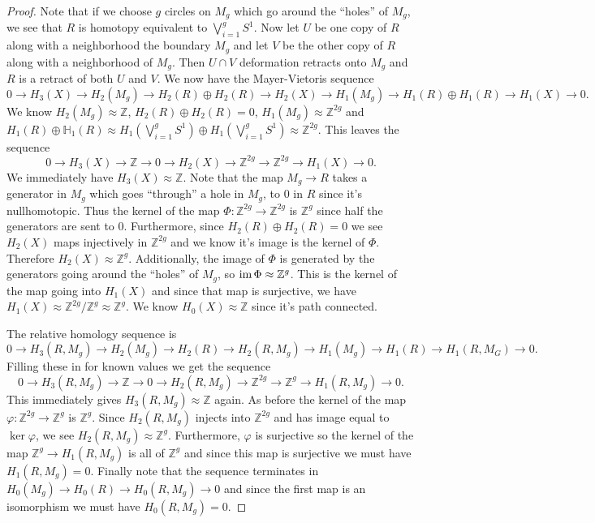 \documentclass{article}
\newcommand{\im}{\textup{im}\,}
\begin{document}
\begin{proof}
Note that if we choose $g$ circles on $M_g$ which go around the ``holes'' of $M_g$, we see that $R$ is homotopy equivalent to $\bigvee_{i=1}^g S^1$. Now let $U$ be one copy of $R$ along with a neighborhood the boundary $M_g$ and let $V$ be the other copy of $R$ along with a neighborhood of $M_g$. Then $U \cap V$ deformation retracts onto $M_g$ and $R$ is a retract of both $U$ and $V$. We now have the Mayer-Vietoris sequence
\[
0 \to H_3(X) \to H_2(M_g) \to H_2(R) \oplus H_2(R) \to H_2(X) \to H_1(M_g) \to H_1(R) \oplus H_1(R) \to H_1(X) \to 0.
\]
We know $H_2(M_g) \approx \mathbb{Z}$, $H_2(R) \oplus H_2(R) = 0$, $H_1(M_g) \approx \mathbb{Z}^{2g}$ and $H_1(R) \oplus \mathbb{H}_1(R) \approx H_1 \left ( \bigvee_{i=1}^g S^1 \right ) \oplus H_1 \left ( \bigvee_{i=1}^g S^1 \right ) \approx \mathbb{Z}^{2g}$. This leaves the sequence
\[
0 \to H_3(X) \to \mathbb{Z} \to 0 \to H_2(X) \to \mathbb{Z}^{2g} \to \mathbb{Z}^{2g} \to H_1(X) \to 0.
\]
We immediately have $H_3(X) \approx \mathbb{Z}$. Note that the map $M_g \to R$ takes a generator in $M_g$ which goes ``through'' a hole in $M_g$, to $0$ in $R$ since it's nullhomotopic. Thus the kernel of the map $\Phi : \mathbb{Z}^{2g} \to \mathbb{Z}^{2g}$ is $\mathbb{Z}^g$ since half the generators are sent to $0$. Furthermore, since $H_2(R) \oplus H_2(R) = 0$ we see $H_2(X)$ maps injectively in $\mathbb{Z}^{2g}$ and we know it's image is the kernel of $\Phi$. Therefore $H_2(X) \approx \mathbb{Z}^g$. Additionally, the image of $\Phi$ is generated by the generators going around the ``holes'' of $M_g$, so $\im \Phi \approx \mathbb{Z}^g$. This is the kernel of the map going into $H_1(X)$ and since that map is surjective, we have $H_1(X) \approx \mathbb{Z}^{2g}/\mathbb{Z}^g \approx \mathbb{Z}^{g}$. We know $H_0(X) \approx \mathbb{Z}$ since it's path connected.

The relative homology sequence is
\[
0 \to H_3(R, M_g) \to H_2(M_g) \to H_2(R) \to H_2(R, M_g) \to H_1(M_g) \to H_1(R) \to H_1(R, M_G) \to 0.
\]
Filling these in for known values we get the sequence
\[
0 \to H_3(R, M_g) \to \mathbb{Z} \to 0 \to H_2(R, M_g) \to \mathbb{Z}^{2g} \to \mathbb{Z}^g \to H_1(R, M_g) \to 0.
\]
This immediately gives $H_3(R, M_g) \approx \mathbb{Z}$ again. As before the kernel of the map $\varphi : \mathbb{Z}^{2g} \to \mathbb{Z}^g$ is $\mathbb{Z}^g$. Since $H_2(R, M_g)$ injects into $\mathbb{Z}^{2g}$ and has image equal to $\ker \varphi$, we see $H_2(R, M_g) \approx \mathbb{Z}^g$. Furthermore, $\varphi$ is surjective so the kernel of the map $\mathbb{Z}^g \to H_1(R, M_g)$ is all of $\mathbb{Z}^g$ and since this map is surjective we must have $H_1(R, M_g) = 0$. Finally note that the sequence terminates in $H_0(M_g) \to H_0(R) \to H_0(R, M_g) \to 0$ and since the first map is an isomorphism we must have $H_0(R, M_g) = 0$.
\end{proof}
\end{document}
